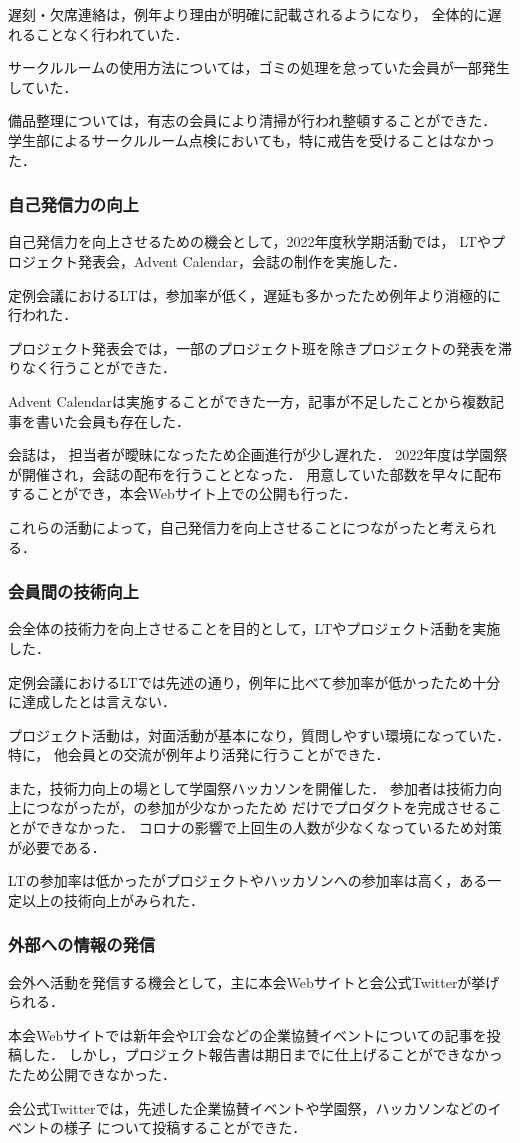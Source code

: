     遅刻・欠席連絡は，例年より理由が明確に記載されるようになり，
    全体的に遅れることなく行われていた．
    
    サークルルームの使用方法については，ゴミの処理を怠っていた会員が一部発生していた．
    
    備品整理については，有志の会員により清掃が行われ整頓することができた．
    学生部によるサークルルーム点検においても，特に戒告を受けることはなかった．

\subsubsection*{自己発信力の向上}
    自己発信力を向上させるための機会として，2022年度秋学期活動では，
    LTやプロジェクト発表会，Advent Calendar，会誌の制作を実施した．

    定例会議におけるLTは，参加率が低く，遅延も多かったため例年より消極的に行われた．

    プロジェクト発表会では，一部のプロジェクト班を除きプロジェクトの発表を滞りなく行うことができた．
    
    Advent Calendarは実施することができた一方，記事が不足したことから複数記事を書いた会員も存在した．

    会誌は，
    担当者が曖昧になったため企画進行が少し遅れた．
    2022年度は学園祭が開催され，会誌の配布を行うこととなった．
    用意していた部数を早々に配布することができ，本会Webサイト上での公開も行った．
    
    これらの活動によって，自己発信力を向上させることにつながったと考えられる．
    
\subsubsection*{会員間の技術向上}
    会全体の技術力を向上させることを目的として，LTやプロジェクト活動を実施した．

    定例会議におけるLTでは先述の通り，例年に比べて参加率が低かったため十分に達成したとは言えない．

    プロジェクト活動は，対面活動が基本になり，質問しやすい環境になっていた．
    特に，
    他会員との交流が例年より活発に行うことができた．

    また，技術力向上の場として学園祭ハッカソンを開催した．
    参加者は技術力向上につながったが，\thirdGrade{}の参加が少なかったため
    \firstGrade{}だけでプロダクトを完成させることができなかった．
    コロナの影響で上回生の人数が少なくなっているため対策が必要である．
    
    LTの参加率は低かったがプロジェクトやハッカソンへの参加率は高く，ある一定以上の技術向上がみられた．

\subsubsection*{外部への情報の発信}
    会外へ活動を発信する機会として，主に本会Webサイトと会公式Twitterが挙げられる．

    本会Webサイトでは新年会やLT会などの企業協賛イベントについての記事を投稿した．
    しかし，プロジェクト報告書は期日までに仕上げることができなかったため公開できなかった．

    会公式Twitterでは，先述した企業協賛イベントや学園祭，ハッカソンなどのイベントの様子
    について投稿することができた．
